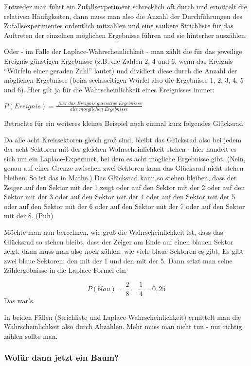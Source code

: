 \documentclass[
  ngerman,
]{book}
\begin{document}
Entweder man führt ein Zufallsexperiment schrecklich oft durch und ermittelt die relativen Häufigkeiten, dann muss man also die Anzahl der Durchführungen des Zufallsexperimentes ordentlich mitzählen und eine saubere Strichliste für das Auftreten der einzelnen möglichen Ergebnisse führen und sie hinterher auszählen.

Oder - im Falle der Laplace-Wahrscheinlichkeit - man zählt die für das jeweilige Ereignis günstigen Ergebnisse (z.B. die Zahlen 2, 4 und 6, wenn das Ereignis ``Würfeln einer geraden Zahl'' lautet) und dividiert diese durch die Anzahl der möglichen Ergebnisse (beim sechsseitigen Würfel also die Ergebnisse 1, 2, 3, 4, 5 und 6). Hier gilt ja für die Wahrscheinlichkeit eines Ereignisses immer:

\(P(Ereignis) = \frac{\;fuer\;das\;Ereignis\;guenstige\;Ergebnisse}{alle\;moeglichen\;Ergebnisse}\)

Betrachte für ein weiteres kleines Beispiel noch einmal kurz folgendes Glücksrad:

Da alle acht Kreissektoren gleich groß sind, bleibt das Glücksrad also bei jedem der acht Sektoren mit der gleichen Wahrscheinlichkeit stehen - hier handelt es sich um ein Laplace-Experimet, bei dem es acht mögliche Ergebnisse gibt. (Nein, genau auf einer Grenze zwischen zwei Sektoren kann das Glücksrad nicht stehen bleiben. So ist das in Mathe.) Das Glücksrad kann so stehen bleiben, dass der Zeiger auf den Sektor mit der 1 zeigt oder auf den Sektor mit der 2 oder auf den Sektor mit der 3 oder auf den Sektor mit der 4 oder auf den Sektor mit der 5 oder auf den Sektor mit der 6 oder auf den Sektor mit der 7 oder auf den Sektor mit der 8. (Puh)

Möchte man nun berechnen, wie groß die Wahrscheinlichkeit ist, dass das Glücksrad so stehen bleibt, dass der Zeiger am Ende auf einen blauen Sektor zeigt, dann muss man also noch zählen, wie viele blaue Sektoren es gibt. Es gibt zwei blaue Sektoren: den mit der 1 und den mit der 5. Dann setzt man seine Zählergebnisse in die Laplace-Formel ein:

\[P(blau)=\frac{2}{8}=\frac{1}{4}=0,25\]
Das war's.

In beiden Fällen (Strichliste und Laplace-Wahrscheinlichkeit) ermittelt man die Wahrscheinlichkeit also durch Abzählen. Mehr muss man nicht tun - nur richtig zählen sollte man.

\hypertarget{wofuxfcr-dann-jetzt-ein-baum}{%
\subsubsection*{Wofür dann jetzt ein Baum?}\label{wofuxfcr-dann-jetzt-ein-baum}}
\end{document}
